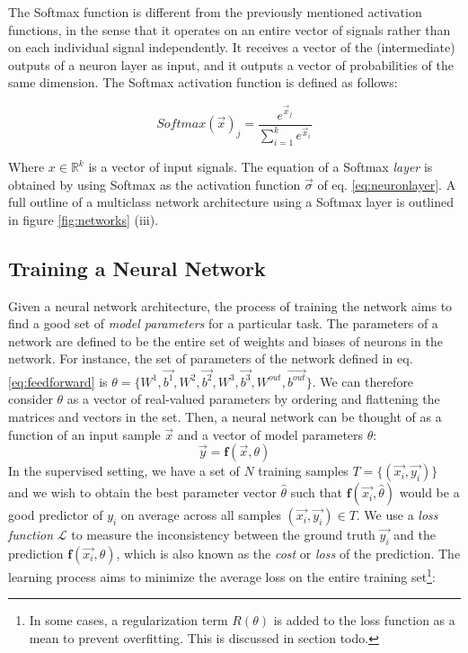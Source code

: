 The Softmax function is different from the previously mentioned activation functions, in the sense that it operates on an entire vector of signals rather than on each individual signal independently. It receives a vector of the (intermediate) outputs of a neuron layer as input, and it outputs a vector of probabilities of the same dimension. The Softmax activation function is defined as follows:

\begin{equation}
    Softmax( \vec{x} )_j = \frac{e^{\vec{x}_j}}{\sum_{i=1}^k e^{\vec{x}_i}}
    \label{eq:softmax}
\end{equation}

Where $x \in \mathbb{R}^k$ is a vector of input signals. The equation of a Softmax \emph{layer} is obtained by using Softmax as the activation function \(\vec{\sigma}\) of eq.  \ref{eq:neuronlayer}. A full outline of a multiclass network architecture using a Softmax layer is outlined in figure \ref{fig:networks} (iii).

\subsection{Training a Neural Network}
Given a neural network architecture, the process of training the network aims to find a good set of \emph{model parameters} for a particular task. The parameters of a network are defined to be the entire set of weights and biases of neurons in the network. For instance, the set of parameters of the network defined in eq. \ref{eq:feedforward} is $\theta = \{W^1, \vec{b^1}, W^2, \vec{b^2}, W^3, \vec{b^3}, W^{out}, \vec{b^{out}}\}$. We can therefore consider $\theta$ as a vector of real-valued parameters by ordering and flattening the matrices and vectors in the set. Then, a neural network can be thought of as a function of an input sample $\vec{x}$ and a vector of model parameters $\theta$: 
$$ \vec{y} = \textbf{f}(\vec{x}, \theta) $$ 
In the supervised setting, we have a set of $N$ training samples $T = \{(\vec{x_i}, \vec{y_i})\}$ and we wish to obtain the best parameter vector $\hat{\theta}$ such that $\textbf{f}(\vec{x_i}, \hat{\theta})$ would be a good predictor of $y_i$ on average across all samples $(\vec{x_i}, \vec{y_i}) \in T$.  We use a \emph{loss function} $\mathcal{L}$ to measure the inconsistency between the ground truth $\vec{y_i}$ and the prediction $\textbf{f}(\vec{x_i}, \theta)$, which is also known as the \emph{cost} or \emph{loss} of the prediction. The learning process aims to minimize the average loss on the entire training set\footnote{In some cases, a regularization term $R(\theta)$ is added to the loss function as a mean to prevent overfitting. This is discussed in section todo.}:

